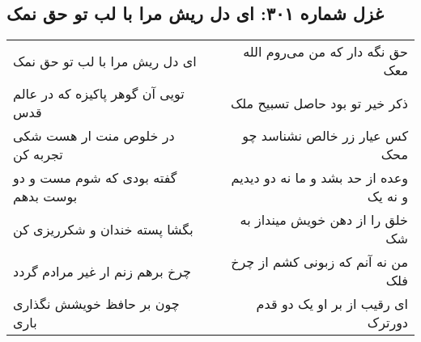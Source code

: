 \begin{center}
\section*{غزل شماره ۳۰۱: ای دل ریش مرا با لب تو حق نمک}
\label{sec:sh301}
\begin{longtable}{l p{0.5cm} r}
ای دل ریش مرا با لب تو حق نمک
&&
حق نگه دار که من می‌روم الله معک
\\
تویی آن گوهر پاکیزه که در عالم قدس
&&
ذکر خیر تو بود حاصل تسبیح ملک
\\
در خلوص منت ار هست شکی تجربه کن
&&
کس عیار زر خالص نشناسد چو محک
\\
گفته بودی که شوم مست و دو بوست بدهم
&&
وعده از حد بشد و ما نه دو دیدیم و نه یک
\\
بگشا پسته خندان و شکرریزی کن
&&
خلق را از دهن خویش مینداز به شک
\\
چرخ برهم زنم ار غیر مرادم گردد
&&
من نه آنم که زبونی کشم از چرخ فلک
\\
چون بر حافظ خویشش نگذاری باری
&&
ای رقیب از بر او یک دو قدم دورترک
\\
\end{longtable}
\end{center}

